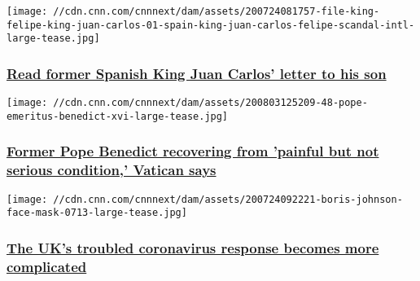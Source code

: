 \href{/2020/08/03/europe/spain-king-juan-carlos-letter-intl/index.html}{}

\texttt{[image: //cdn.cnn.com/cnnnext/dam/assets/200724081757-file-king-felipe-king-juan-carlos-01-spain-king-juan-carlos-felipe-scandal-intl-large-tease.jpg]}

\hypertarget{read-former-spanish-king-juan-carlos-letter-to-his-son}{%
\subsubsection{\texorpdfstring{\href{/2020/08/03/europe/spain-king-juan-carlos-letter-intl/index.html}{Read
former Spanish King Juan Carlos' letter to his
son}}{Read former Spanish King Juan Carlos' letter to his son}}\label{read-former-spanish-king-juan-carlos-letter-to-his-son}}

\href{/2020/08/03/europe/pope-benedict-ill-intl/index.html}{}

\texttt{[image: //cdn.cnn.com/cnnnext/dam/assets/200803125209-48-pope-emeritus-benedict-xvi-large-tease.jpg]}

\hypertarget{former-pope-benedict-recovering-from-painful-but-not-serious-condition-vatican-says}{%
\subsubsection{\texorpdfstring{\href{/2020/08/03/europe/pope-benedict-ill-intl/index.html}{Former
Pope Benedict recovering from 'painful but not serious condition,'
Vatican
says}}{Former Pope Benedict recovering from 'painful but not serious condition,' Vatican says}}\label{former-pope-benedict-recovering-from-painful-but-not-serious-condition-vatican-says}}

\href{/2020/08/03/uk/covid-capital-of-europe-reopens-amid-confusion-and-chaos-intl-gbr/index.html}{}

\texttt{[image: //cdn.cnn.com/cnnnext/dam/assets/200724092221-boris-johnson-face-mask-0713-large-tease.jpg]}

\hypertarget{the-uks-troubled-coronavirus-response-becomes-more-complicated}{%
\subsubsection{\texorpdfstring{\href{/2020/08/03/uk/covid-capital-of-europe-reopens-amid-confusion-and-chaos-intl-gbr/index.html}{The
UK's troubled coronavirus response becomes more
complicated}}{The UK's troubled coronavirus response becomes more complicated}}\label{the-uks-troubled-coronavirus-response-becomes-more-complicated}}

